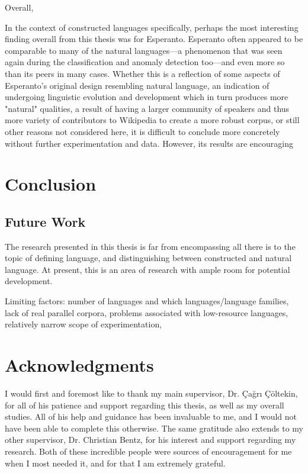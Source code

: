 \documentclass[12pt,a4paper]{article}
\numberwithin{figure}{section}
\numberwithin{table}{section}
\numberwithin{definition}{section}
\begin{document}
Overall,

In the context of constructed languages specifically, perhaps the most interesting finding overall from this thesis was for Esperanto. Esperanto often appeared to be comparable to many of the natural languages---a phenomenon that was seen again during the classification and anomaly detection too---and even more so than its peers in many cases. Whether this is a reflection of some aspects of Esperanto's original design resembling natural language, an indication of undergoing linguistic evolution and development which in turn produces more "natural" qualities, a result of having a larger community of speakers and thus more variety of contributors to Wikipedia to create a more robust corpus, or still other reasons not considered here, it is difficult to conclude more concretely without further experimentation and data. However, its results are encouraging

\clearpage
\newpage
\section{Conclusion}
\label{sec:conclusion}



\subsection{Future Work}
\label{ssec:futurework}

The research presented in this thesis is far from encompassing all there is to the topic of defining language, and distinguishing between constructed and natural language. At present, this is an area of research with ample room for potential development. 

Limiting factors: number of languages and which languages/language families, lack of real parallel corpora, problems associated with low-resource languages, relatively narrow scope of experimentation,

\newpage
\section{Acknowledgments}
\label{sec:acknowledgments}

I would first and foremost like to thank my main supervisor, Dr. Çağrı Çöltekin, for all of his patience and support regarding this thesis, as well as my overall studies. All of his help and guidance has been invaluable to me, and I would not have been able to complete this otherwise. The same gratitude also extends to my other supervisor, Dr. Christian Bentz, for his interest and support regarding my research. Both of these incredible people were sources of encouragement for me when I most needed it, and for that I am extremely grateful. 
\end{document}
